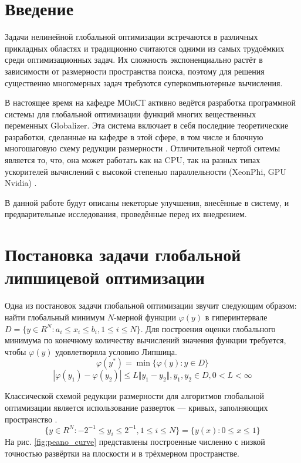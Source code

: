 \section{Введение}
Задачи нелинейной глобальной оптимизации встречаются в различных прикладных областях и
традиционно считаются одними из самых трудоёмких среди оптимизационных задач.
Их сложность экспоненциально растёт в зависимости от размерности пространства поиска,
поэтому для решения существенно многомерных задач требуются суперкомпьютерные вычисления.

В настоящее время на кафедре МОиСТ активно ведётся разработка программной системы
для глобальной оптимизации функций многих вещественных переменных Globalizer.
Эта система включает в себя последние теоретические разработки, сделанные на кафедре в
этой сфере, в том числе и блочную многошаговую схему редукции размерности \cite{blockNested}.
Отличительной чертой ситемы является то, что, она может работать как на CPU, так на
разных типах ускорителей вычислений с высокой степенью параллельности (XeonPhi, GPU Nvidia) \cite{examinArtcle, examinphiArtcle}.

В данной работе будут описаны некеторые улучшения, внесённые в систему, и предварительные исследования, проведённые перед их внедрением.

\section{Постановка задачи глобальной липшицевой оптимизации}
Одна из постановок задачи глобальной оптимизации звучит следующим образом: найти
глобальный минимум \(N\)-мерной функции \(\varphi(y)\) в гиперинтервале
\(D=\{y\in R^N:a_i\leqslant x_i\leqslant{b_i}, 1\leqslant{i}\leqslant{N}\}\).
Для построения оценки глобального минимума по конечному количеству вычислений
значения функции требуется, чтобы \(\varphi(y)\) удовлетворяла условию Липшица.
\begin{displaymath}
\label{task}
\varphi(y^*)=\min\{\varphi(y):y\in D\}
\end{displaymath}
\begin{displaymath}
\label{lip}
|\varphi(y_1)-\varphi(y_2)|\leqslant L\Vert y_1-y_2\Vert,y_1,y_2\in D,0<L<\infty
\end{displaymath}

Классической схемой редукции размерности для алгоритмов глобальной оптимизации является
использование разверток --- кривых, заполняющих пространство \cite{strOptBook}.
\begin{displaymath}
\label{cube}
\lbrace y\in R^N:-2^{-1}\leqslant y_i\leqslant 2^{-1},1\leqslant i\leqslant N\rbrace=\{y(x):0\leqslant x\leqslant 1\}
\end{displaymath}
На рис. \ref{fig:peano_curve} представлены построенные численно с низкой точностью развёртки на плоскости и
в трёхмерном пространстве.

